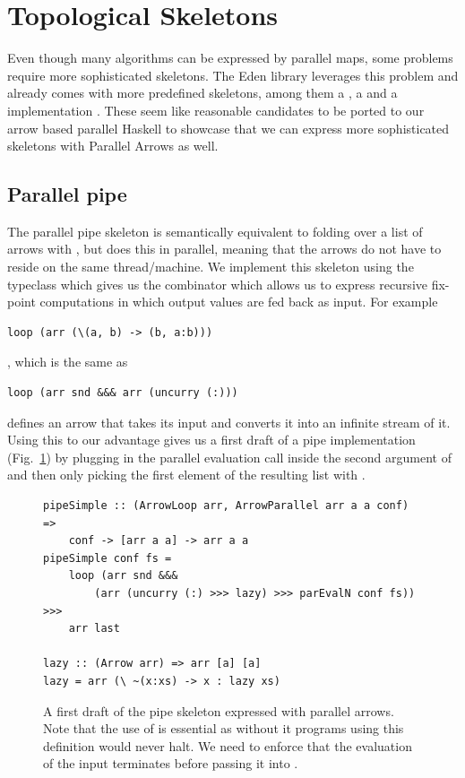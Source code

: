 \FloatBarrier
\section{Topological Skeletons}
\label{sec:topology-skeletons}
Even though many algorithms can be expressed by parallel maps, some problems require more sophisticated skeletons. The Eden library leverages this problem and already comes with more predefined skeletons, among them a , a  and a  implementation \cite{Loogen2012, eden_skel_topology}. These seem like reasonable candidates to be ported to our arrow based parallel Haskell to showcase that we can express more sophisticated skeletons with Parallel Arrows as well.

\subsection{Parallel pipe}

The parallel pipe skeleton is semantically equivalent to folding over a list \inlinecode{[arr a a]} of arrows with \inlinecode{>>>}, but does this in parallel, meaning that the arrows do not have to reside on the same thread/machine. We implement this skeleton using the  typeclass which gives us the  combinator which allows us to express recursive fix-point computations in which output values are fed back as input. For example %
\begin{lstlisting}[frame=htrbl]
loop (arr (\(a, b) -> (b, a:b)))
\end{lstlisting}
, which is the same as
\begin{lstlisting}[frame=htrbl]
loop (arr snd &&& arr (uncurry (:)))
\end{lstlisting}
defines an arrow that takes its input  and converts it into an infinite stream \inlinecode{[a]} of it. Using this to our advantage gives us a first draft of a pipe implementation (Fig.~\ref{fig:pipeSimple}) by plugging in the parallel evaluation call  inside the second argument of \inlinecode{(\&\&\&)} and then only picking the first element of the resulting list with .
\begin{figure}[h]
\begin{lstlisting}[frame=htrbl]
pipeSimple :: (ArrowLoop arr, ArrowParallel arr a a conf) =>
	conf -> [arr a a] -> arr a a
pipeSimple conf fs =
	loop (arr snd &&&
		(arr (uncurry (:) >>> lazy) >>> parEvalN conf fs)) >>>
	arr last

lazy :: (Arrow arr) => arr [a] [a]
lazy = arr (\ ~(x:xs) -> x : lazy xs)
\end{lstlisting}
\caption{A first draft of the pipe skeleton expressed with parallel arrows. Note that the use of  is essential as without it programs using this definition would never halt. We need to enforce that the evaluation of the input \inlinecode{[a]} terminates before passing it into .}
\label{fig:pipeSimple}
\end{figure}

